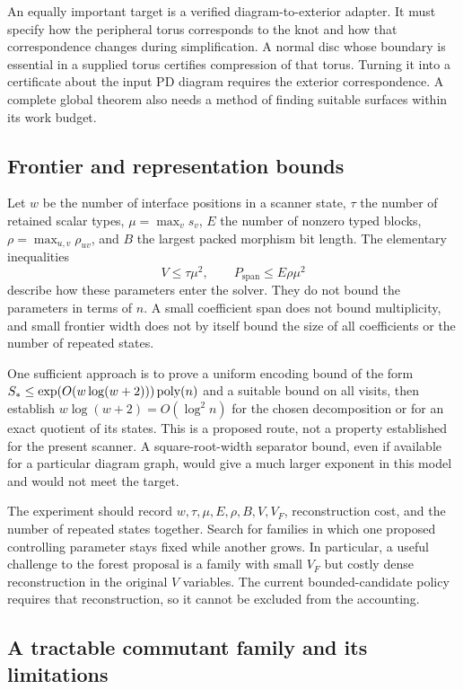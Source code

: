 An equally important target is a verified diagram-to-exterior adapter.
It must specify how the peripheral torus corresponds to the knot and how
that correspondence changes during simplification. A normal disc whose
boundary is essential in a supplied torus certifies compression of that
torus. Turning it into a certificate about the input PD diagram requires
the exterior correspondence. A complete global theorem also needs a
method of finding suitable surfaces within its work budget.

\subsection{Frontier and representation bounds}

Let $w$ be the number of interface positions in a scanner state, $\tau$
the number of retained scalar types, $\mu=\max_v s_v$, $E$ the number of
nonzero typed blocks, $\rho=\max_{u,v}\rho_{uv}$, and $B$ the largest
packed morphism bit length. The elementary inequalities
\[
              V\le\tau\mu^2,\qquad
              P_{\mathrm{span}}\le E\rho\mu^2
\]
describe how these parameters enter the solver. They do not bound the
parameters in terms of $n$. A small coefficient span does not bound
multiplicity, and small frontier width does not by itself bound the
size of all coefficients or the number of repeated states.

One sufficient approach is to prove a uniform encoding bound of the form
$S_*\le\exp(O(w\log(w+2)))\operatorname{poly}(n)$ and a suitable bound on all visits,
then establish $w\log(w+2)=O(\log^2 n)$ for the chosen decomposition or
for an exact quotient of its states. This is a proposed route, not a
property established for the present scanner. A square-root-width
separator bound, even if available for a particular diagram graph, would
give a much larger exponent in this model and would not meet the target.

The experiment should record $w,\tau,\mu,E,\rho,B,V,V_F$, reconstruction
cost, and the number of repeated states together. Search for families in
which one proposed controlling parameter stays fixed while another grows.
In particular, a useful challenge to the forest proposal is a family with
small $V_F$ but costly dense reconstruction in the original $V$ variables.
The current bounded-candidate policy requires that reconstruction, so it
cannot be excluded from the accounting.

\subsection{A tractable commutant family and its limitations}

